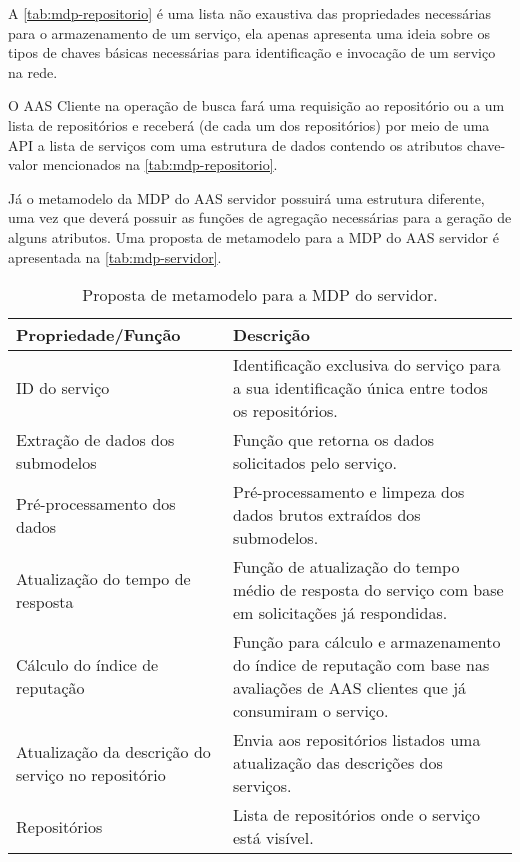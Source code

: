 	A \autoref{tab:mdp-repositorio} é uma lista não exaustiva das propriedades necessárias para o armazenamento de um serviço, ela apenas apresenta uma ideia sobre os tipos de chaves básicas necessárias para identificação e invocação de um serviço na rede.
	
	O AAS Cliente na operação de busca fará uma requisição ao repositório ou a um lista de repositórios e receberá (de cada um dos repositórios) por meio de uma API a lista de serviços com uma estrutura de dados contendo os atributos chave-valor mencionados na \autoref{tab:mdp-repositorio}.
	
	Já o metamodelo da MDP do AAS servidor possuirá uma estrutura diferente, uma vez que deverá possuir as funções de agregação necessárias para a geração de alguns atributos. Uma proposta de metamodelo para a MDP do AAS servidor é apresentada na \autoref{tab:mdp-servidor}.
	
	\begin{table}[htb]
		\centering
		\caption{Proposta de metamodelo para a MDP do servidor.}
		\label{tab:mdp-servidor}
		\begin{tabular}{p{4cm}p{11cm}}
			\hline
			\textbf{Propriedade/Função}
			& \textbf{Descrição} \\ 
			
			\hline
			ID do serviço
			& Identificação exclusiva do serviço para a sua identificação única entre todos os repositórios. \\
			
			\hline
			Extração de dados dos submodelos
			& Função que retorna os dados solicitados pelo serviço. \\
			
			\hline
			Pré-processamento dos dados
			& Pré-processamento e limpeza dos dados brutos extraídos dos submodelos. \\
			
			\hline
			Atualização do tempo de resposta
			& Função de atualização do tempo médio de resposta do serviço com base em solicitações já respondidas. \\
			
			\hline
			Cálculo do índice de reputação
			& Função para cálculo e armazenamento do índice de reputação com base nas avaliações de AAS clientes que já consumiram o serviço. \\
			
			\hline
			Atualização da descrição do serviço no repositório
			& Envia aos repositórios listados uma atualização das descrições dos serviços. \\
			
			\hline
			Repositórios
			& Lista de repositórios onde o serviço está visível. \\			
			\hline
		\end{tabular}
	\end{table}
	
